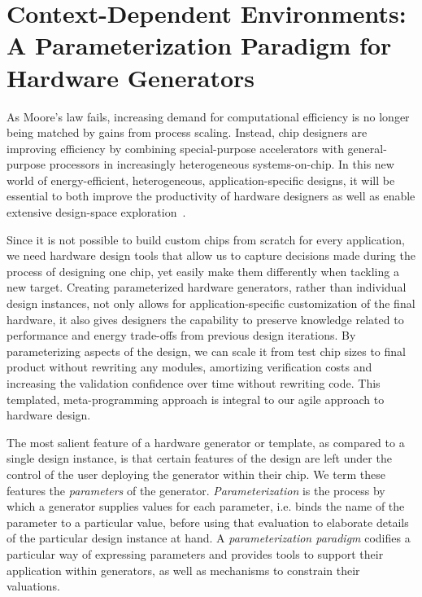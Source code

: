 \chapter{Context-Dependent Environments: \\ A Parameterization Paradigm for Hardware Generators}
\label{c.parameters}

As Moore's law fails, increasing demand for computational efficiency is no longer being matched by gains from process scaling. 
Instead, chip designers are improving efficiency by combining special-purpose accelerators with general-purpose processors in increasingly heterogeneous systems-on-chip.
In this new world of energy-efficient, heterogeneous, application-specific designs, it will be essential to both improve the productivity of hardware designers as well as enable extensive design-space exploration~\cite{shacham-micro10}.

Since it is not possible to build custom chips from scratch for every application,
we need hardware design tools that allow us to capture decisions made
during the process of designing one chip, yet easily make them differently when tackling a new target.
Creating parameterized hardware generators, rather than individual design instances, 
not only allows for application-specific customization of the final hardware,
it also gives designers the capability to preserve knowledge related to performance and energy trade-offs from previous design iterations.
By parameterizing aspects of the design, we can scale it from test chip sizes to final product without rewriting any modules, amortizing verification costs and increasing the validation confidence over time without rewriting code.
This templated, meta-programming approach is integral to our agile approach to hardware design.

The most salient feature of a hardware generator or template, as
compared to a single design instance, is that certain features of the design are
left under the control of the user deploying the generator within their chip.
We term these features the {\em parameters} of the generator.
{\em Parameterization} is the process by which a generator supplies values for each parameter,
i.e. binds the name of the parameter to a particular value,
before using that evaluation to elaborate details of the particular design instance at hand.
A {\em parameterization paradigm} codifies a particular way of expressing parameters and provides tools to support their application within generators,
as well as mechanisms to constrain their valuations.

